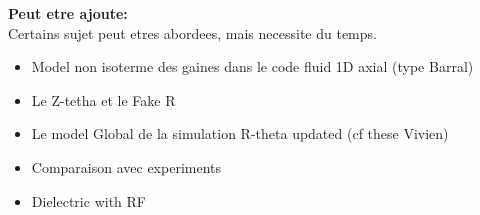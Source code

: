 \vspace{2em}
{\bf Peut etre ajoute\string:}\\
Certains sujet peut etres abordees, mais necessite du temps.
\begin{itemize}
  \item Model non isoterme des gaines dans le code fluid 1D axial (type Barral)
  \item Le Z-tetha et le Fake R
  \item Le model Global de la simulation R-theta updated (cf these Vivien)
  \item Comparaison avec experiments
  \item Dielectric with RF
\end{itemize}
%
%
%
%

%
%
%
%
%
%
%
%

